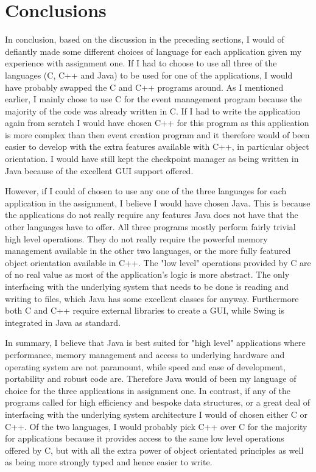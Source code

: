 \documentclass{article}
\begin{document}
\section{Conclusions}
In conclusion, based on the discussion in the preceding sections, I would of defiantly made some different choices of language for each application given my experience with assignment one. If I had to choose to use all three of the languages (C, C++ and Java) to be used for one of the applications, I would have probably swapped the C and C++ programs around. As I mentioned earlier, I mainly chose to use C for the event management program because the majority of the code was already written in C. If I had to write the application again from scratch I would have chosen C++ for this program as this application is more complex than then event creation program and it therefore would of been easier to develop with the extra features available with C++, in particular object orientation. I would have still kept the checkpoint manager as being written in Java because of the excellent GUI support offered.

However, if I could of chosen to use any one of the three languages for each application in the assignment, I believe I would have chosen Java. This is because the applications do not really require any features Java does not have that the other languages have to offer. All three programs mostly perform fairly trivial high level operations. They do not really require the powerful memory management available in the other two languages, or the more fully featured object orientation available in C++. The "low level" operations provided by C are of no real value as most of the application's logic is more abstract. The only interfacing with the underlying system that needs to be done is reading and writing to files, which Java has some excellent classes for anyway. Furthermore both C and C++ require external libraries to create a GUI, while Swing is integrated in Java as standard.

In summary, I believe that Java is best suited for "high level" applications where performance, memory management and access to underlying hardware and operating system are not paramount, while speed and ease of development, portability and robust code are. Therefore Java would of been my language of choice for the three applications in assignment one. In contrast, if any of the programs called for high efficiency and bespoke data structures, or a great deal of interfacing with the underlying system architecture I would of chosen either C or C++. Of the two languages, I would probably pick C++ over C for the majority for applications because it provides access to the same low level operations offered by C, but with all the extra power of object orientated principles as well as being more strongly typed and hence easier to write.
\end{document}
